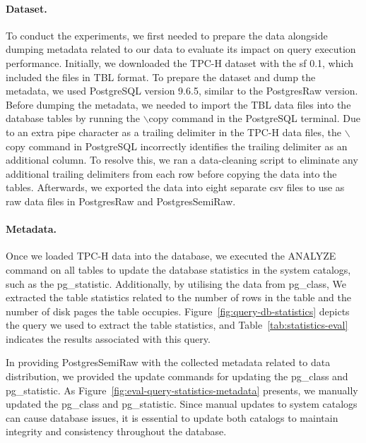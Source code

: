 \paragraph{Dataset.}
\label{par:eval-dataset}
To conduct the experiments, we first needed to prepare the data alongside dumping metadata related to our data to evaluate its impact on query execution performance. Initially, we downloaded the TPC-H dataset with the \acrshort{sf} 0.1, which included the files in TBL format. To prepare the dataset and dump the metadata, we used PostgreSQL version 9.6.5, similar to the PostgresRaw version. Before dumping the metadata, we needed to import the TBL data files into the database tables by running the $\backslash$copy command in the PostgreSQL terminal. Due to an extra pipe character as a trailing delimiter in the TPC-H data files, the $\backslash$copy command in PostgreSQL incorrectly identifies the trailing delimiter as an additional column. To resolve this, we ran a data-cleaning script to eliminate any additional trailing delimiters from each row before copying the data into the tables. Afterwards, we exported the data into eight separate \acrshort{csv} files to use as raw data files in PostgresRaw and PostgresSemiRaw.

\paragraph{Metadata.}
\label{par:eval-metadata}
Once we loaded TPC-H data into the database, we executed the ANALYZE command on all tables to update the database statistics in the system catalogs, such as the pg\_statistic. Additionally, by utilising the data from pg\_class, We extracted the table statistics related to the number of rows in the table and the number of disk pages the table occupies. Figure~\ref{fig:query-db-statistics} depicts the query we used to extract the table statistics, and Table~\ref{tab:statistics-eval} indicates the results associated with this query. 




In providing PostgresSemiRaw with the collected metadata related to data distribution, we provided the update commands for updating the pg\_class and pg\_statistic. As Figure~\ref{fig:eval-query-statistics-metadata} presents, we manually updated the pg\_class and pg\_statistic. Since manual updates to system catalogs can cause database issues, it is essential to update both catalogs to maintain integrity and consistency throughout the database.

